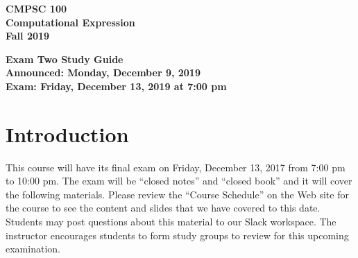 \documentclass[11pt]{article}
\newcommand{\assignmentduedate}{December 13}
\newcommand{\assignmentassignedate}{December 9}
\newcommand{\assignmentnumber}{Two}
\newcommand{\labyear}{2019}
\newcommand{\assignedday}{Monday}
\newcommand{\dueday}{Friday}
\newcommand{\labtime}{7:00 pm}
\newcommand{\assigneddate}{Announced: \assignedday, \assignmentassignedate, \labyear{}}
\newcommand{\duedate}{Exam: \dueday, \assignmentduedate, \labyear{} at \labtime{}}
\newcommand{\guidetitle}[1]
{
  \begin{center}
    \begin{center}
      \bf
      CMPSC 100\\Computational Expression\\
      Fall 2019\\
      \medskip
    \end{center}
    \bf
    #1
  \end{center}
}
\begin{document}
\guidetitle{Exam \assignmentnumber{} Study Guide \\ \assigneddate{} \\ \duedate{}}

\section*{Introduction}

This course will have its final exam on Friday, \assignmentduedate{}, 2017 from
7:00 pm to 10:00 pm. The exam will be ``closed notes'' and ``closed book'' and
it will cover the following materials. Please review the ``Course Schedule'' on
the Web site for the course to see the content and slides that we have covered
to this date. Students may post questions about this material to our Slack
workspace. The instructor encourages students to form study groups to review for
this upcoming examination.
\end{document}
